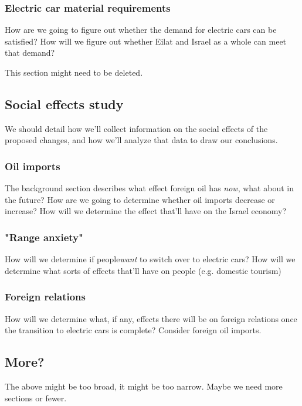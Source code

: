 \documentclass{article}
\begin{document}
\subsubsection{Electric car material requirements}
How are we going to figure out whether the demand for electric cars can be satisfied? How will we figure out whether Eilat and Israel as a whole can meet that demand?

This section might need to be deleted.

\subsection{Social effects study}
We should detail how we'll collect information on the social effects of the proposed changes, and how we'll analyze that data to draw our conclusions.

\subsubsection{Oil imports}
The background section describes what effect foreign oil has \textit{now}, what about in the future? How are we going to determine whether oil imports decrease or increase? How will we determine the effect that'll have on the Israel economy?

\subsubsection{"Range anxiety"}
How will we determine if people\textit{want} to switch over to electric cars? How will we determine what sorts of effects that'll have on people (e.g. domestic tourism)

\subsubsection{Foreign relations}
How will we determine what, if any, effects there will be on foreign relations once the transition to electric cars is complete? Consider foreign oil imports.

\subsection{More?}

The above might be too broad, it might be too narrow. Maybe we need more sections or fewer. \cite{Cheslow2011BetterCountry}

\newpage


\end{document}
